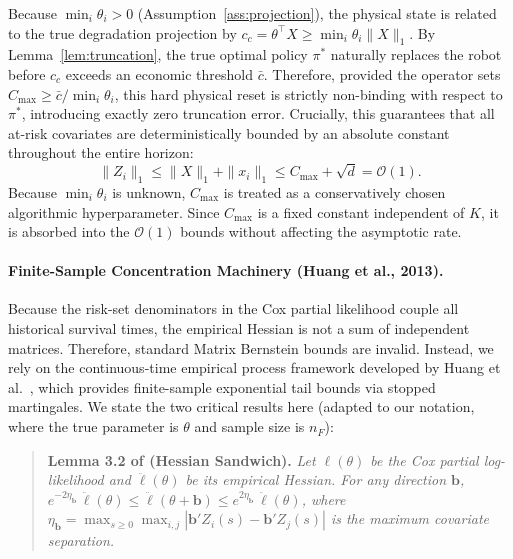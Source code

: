 \documentclass[letterpaper, 10 pt, conference]{IEEEconf}
\begin{document}
Because $\min_i \theta_i > 0$ (Assumption~\ref{ass:projection}), the physical state is related to the true degradation projection by $c_c = \theta^\top X \ge \min_i \theta_i \|X\|_1$. By Lemma~\ref{lem:truncation}, the true optimal policy $\pi^*$ naturally replaces the robot before $c_c$ exceeds an economic threshold $\bar{c}$. Therefore, provided the operator sets $C_{\max} \ge \bar{c} / \min_i \theta_i$, this hard physical reset is strictly non-binding with respect to $\pi^*$, introducing exactly zero truncation error. Crucially, this guarantees that all at-risk covariates are deterministically bounded by an absolute constant throughout the entire horizon:
\begin{equation}
    \label{eq:physical_cap}
    \|Z_i\|_1 \le \|X\|_1 + \|x_i\|_1 \le C_{\max} + \sqrt{d} = \mathcal{O}(1).
\end{equation}
Because $\min_i \theta_i$ is unknown, $C_{\max}$ is treated as a conservatively chosen algorithmic hyperparameter. Since $C_{\max}$ is a fixed constant independent of $K$, it is absorbed into the $\mathcal{O}(1)$ bounds without affecting the asymptotic rate.

\paragraph{Finite-Sample Concentration Machinery (Huang et al., 2013).}
Because the risk-set denominators in the Cox partial likelihood couple all historical survival times, the empirical Hessian is not a sum of independent matrices. Therefore, standard Matrix Bernstein bounds are invalid. Instead, we rely on the continuous-time empirical process framework developed by Huang et al.~\cite{huang2013}, which provides finite-sample exponential tail bounds via stopped martingales. We state the two critical results here (adapted to our notation, where the true parameter is $\theta$ and sample size is $n_F$):

\begin{quote}
\textbf{Lemma 3.2 of \cite{huang2013} (Hessian Sandwich).} \textit{Let $\ell(\theta)$ be the Cox partial log-likelihood and $\ddot{\ell}(\theta)$ be its empirical Hessian. For any direction $\mathbf{b}$, $e^{-2\eta_{\mathbf{b}}}\,\ddot{\ell}(\theta) \leq \ddot{\ell}(\theta+\mathbf{b}) \leq e^{2\eta_{\mathbf{b}}}\,\ddot{\ell}(\theta)$, where $\eta_{\mathbf{b}} = \max_{s \geq 0}\max_{i,j}|\mathbf{b}'Z_i(s) - \mathbf{b}'Z_j(s)|$ is the maximum covariate separation.}
\end{quote}
\end{document}

